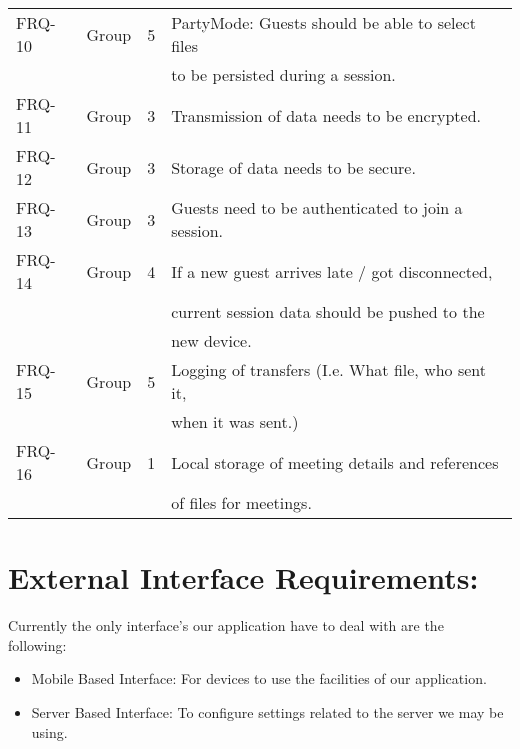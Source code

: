 \documentclass[12pt]{article}
\begin{document}
\begin{center}
\begin{tabular}[h]{|l|l|l|l|}
\hline
FRQ-10 & Group & 5 & PartyMode: Guests should be able to select files\\ & & & 
					 to be persisted during a session.\\
\hline
FRQ-11 & Group & 3 & Transmission of data needs to be encrypted.\\
\hline
FRQ-12 & Group & 3 & Storage of data needs to be secure.\\
\hline
FRQ-13 & Group & 3 & Guests need to be authenticated to join a session.\\
\hline
FRQ-14 & Group & 4 & If a new guest arrives late / got disconnected,\\ & & & 
					 current session data should be pushed to the \\ & & & 
					 new device.\\
\hline
FRQ-15 & Group & 5 & Logging of transfers (I.e. What file, who sent it,\\ & & & 
					 when it was sent.)\\
\hline
FRQ-16 & Group & 1 & Local storage of meeting details and references\\ & & & 
					 of files for meetings.\\
\hline


\end{tabular} \end{center}

\section{External Interface Requirements:}
Currently the only interface's our application have to deal with are the
\\following:
\begin{itemize}
\item Mobile Based Interface: For devices to use the facilities of our application.
\item Server Based Interface: To configure settings related to the server we may be using.
\end{itemize}
\end{document}

